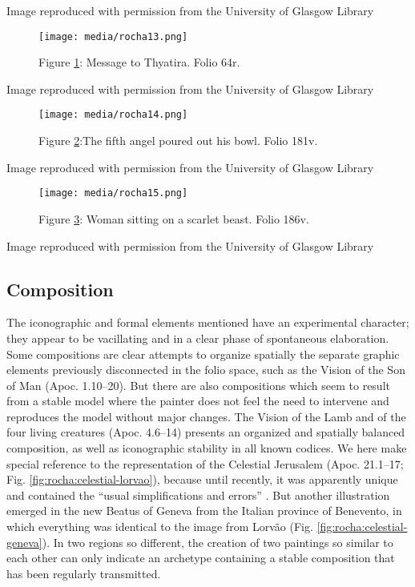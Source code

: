 \documentclass{article}
\begin{document}
 Image reproduced with permission from the University of Glasgow Library 


 
    \begin{figure}
    \centering
    \texttt{[image: media/rocha13.png]}
    \caption{Figure \ref{fig:rocha:thyatira}: Message to Thyatira. Folio 64r.}
    \label{fig:rocha:thyatira}
\end{figure}


 Image reproduced with permission from the University of Glasgow Library 


 

\begin{figure}[H]
    \centering
    \texttt{[image: media/rocha14.png]}
    \caption{Figure \ref{fig:rocha:angel}:The fifth angel poured out his bowl. Folio 181v.}
    \label{fig:rocha:angel}
\end{figure}


 Image reproduced with permission from the University of Glasgow Library 


 
  \begin{figure}
    \centering
    \texttt{[image: media/rocha15.png]}
    \caption{Figure \ref{fig:rocha:scarlet}: Woman sitting on a scarlet beast. Folio 186v.}
    \label{fig:rocha:scarlet}
\end{figure}


 Image reproduced with permission from the University of Glasgow Library 


 
\subsection*{Composition}

The iconographic and formal elements mentioned have an experimental
character; they appear to be vacillating and in a clear phase of
spontaneous elaboration. Some compositions are clear attempts to
organize spatially the separate graphic elements previously disconnected
in the folio space, such as the Vision of the Son of Man (Apoc.
1.10--20). But there are also compositions which seem to result from a
stable model where the painter does not feel the need to intervene and
reproduces the model without major changes. The Vision of the Lamb and
of the four living creatures (Apoc. 4.6--14) presents an organized and
spatially balanced composition, as well as iconographic stability in all
known codices. We here make special reference to the representation of
the Celestial Jerusalem (Apoc. 21.1--17; Fig. \ref{fig:rocha:celestial-lorvao}), because until
recently, it was apparently unique and contained the ``usual
simplifications and errors'' \citep[136]{klein_beato_2004}. But another illustration
emerged in the new Beatus of Geneva from the Italian province of
Benevento, in which everything was identical to the image from Lorvão
(Fig. \ref{fig:rocha:celestial-geneva}). In two regions so different, the creation of two paintings so
similar to each other can only indicate an archetype containing a stable
composition that has been regularly transmitted.
\end{document}
